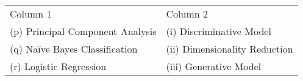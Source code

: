 \begin{center}
\begin{tabular}{ll}
Column 1 & Column 2 \\
(p) Principal Component Analysis & (i) Discriminative Model\\
(q) Na\"ive Bayes Classification & (ii) Dimensionality Reduction\\
(r) Logistic Regression& (iii) Generative Model\\
\end{tabular}
\end{center}